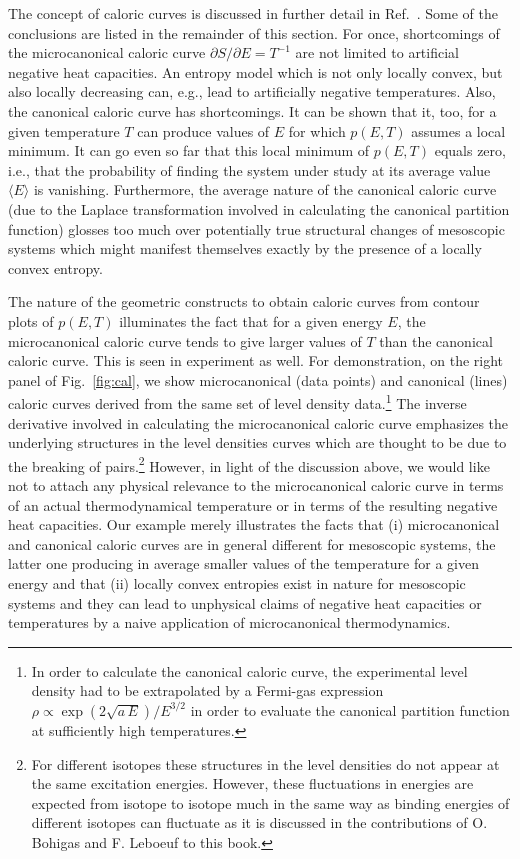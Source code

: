 \documentclass[sort&compress,final,numberedheadings]{aipproc}
\begin{document}
The concept of caloric curves is discussed in further detail in Ref.\ 
\cite{SG03}. Some of the conclusions are listed in the remainder of this 
section. For once, shortcomings of the microcanonical caloric curve 
$\partial S/\partial E=T^{-1}$ are not limited to artificial negative heat 
capacities. An entropy model which is not only locally convex, but also locally
decreasing can, e.g., lead to artificially negative temperatures. Also, the 
canonical caloric curve has shortcomings. It can be shown that it, too, for a 
given temperature $T$ can produce values of $E$ for which $p(E,T)$ assumes a 
local minimum. It can go even so far that this local minimum of $p(E,T)$ equals
zero, i.e., that the probability of finding the system under study at its 
average value $\langle E\rangle$ is vanishing. Furthermore, the average nature 
of the canonical caloric curve (due to the Laplace transformation involved in 
calculating the canonical partition function) glosses too much over potentially
true structural changes of mesoscopic systems which might manifest themselves 
exactly by the presence of a locally convex entropy.

The nature of the geometric constructs to obtain caloric curves from contour 
plots of $p(E,T)$ illuminates the fact that for a given energy $E$, the 
microcanonical caloric curve tends to give larger values of $T$ than the 
canonical caloric curve. This is seen in experiment as well. For demonstration,
on the right panel of Fig.\ \ref{fig:cal}, we show microcanonical (data points)
and canonical (lines) caloric curves \cite{MB99} derived from the same set of 
level density data.\footnote{In order to calculate the canonical caloric curve,
the experimental level density had to be extrapolated by a Fermi-gas expression
$\rho\propto\exp(2\sqrt{a\,E})/E^{3/2}$ in order to evaluate the canonical 
partition function at sufficiently high temperatures.} The inverse derivative 
involved in calculating the microcanonical caloric curve emphasizes the 
underlying structures in the level densities curves which are thought to be due
to the breaking of pairs.\footnote{For different isotopes these structures in 
the level densities do not appear at the same excitation energies. However, 
these fluctuations in energies are expected from isotope to isotope much in the
same way as binding energies of different isotopes can fluctuate as it is 
discussed in the contributions of O. Bohigas and F. Leboeuf to this book.} 
However, in light of the discussion above, we would like not to attach any 
physical relevance to the microcanonical caloric curve in terms of an actual 
thermodynamical temperature or in terms of the resulting negative heat 
capacities. Our example merely illustrates the facts that (i) microcanonical 
and canonical caloric curves are in general different for mesoscopic systems, 
the latter one producing in average smaller values of the temperature for a 
given energy and that (ii) locally convex entropies exist in nature for 
mesoscopic systems and they can lead to unphysical claims of negative heat 
capacities or temperatures by a naive application of microcanonical 
thermodynamics. 
\end{document}

